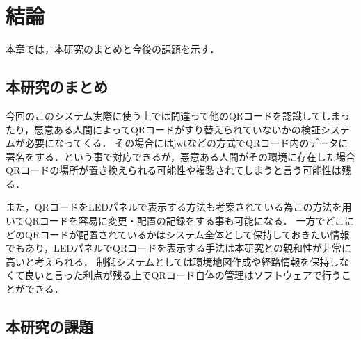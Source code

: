 \chapter{結論}
\label{conclusion}

本章では，本研究のまとめと今後の課題を示す．

\section{本研究のまとめ}

今回のこのシステム実際に使う上では間違って他のQRコードを認識してしまったり，悪意ある人間によってQRコードがすり替えられていないかの検証システムが必要になってくる．
その場合にはjwtなどの方式でQRコード内のデータに署名をする．という事で対応できるが，悪意ある人間がその環境に存在した場合QRコードの場所が置き換えられる可能性や複製されてしまうと言う可能性は残る．

また，QRコードをLEDパネルで表示する方法\cite{led_qr}も考案されている為この方法を用いてQRコードを容易に変更・配置の記録をする事も可能になる．
一方でどこにどのQRコードが配置されているかはシステム全体として保持しておきたい情報でもあり，LEDパネルでQRコードを表示する手法は本研究との親和性が非常に高いと考えられる．
制御システムとしては環境地図作成や経路情報を保持しなくて良いと言った利点が残る上でQRコード自体の管理はソフトウェアで行うことができる．



\section{本研究の課題}

